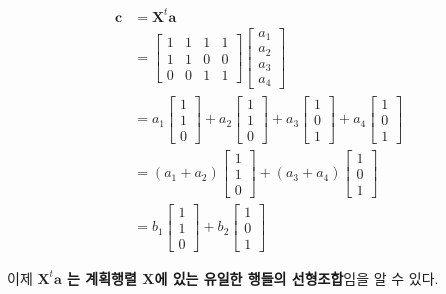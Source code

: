 \documentclass[
]{book}
\newcommand{\bm}[1]{\boldsymbol{\mathbf{#1}}}
\begin{document}
\begin{align}
\bm c &= 
\bm X^t \bm a \\ & = 
\begin{bmatrix}
1 & 1 & 1 & 1  \\
1 & 1 & 0 & 0  \\
0 & 0 & 1 & 1  
\end{bmatrix}
\begin{bmatrix}
a_1 \\
a_2 \\
a_3 \\
a_4 
\end{bmatrix} \\
& = 
a_1 
\begin{bmatrix}
1 \\
1 \\
0 
\end{bmatrix}
+
a_2
\begin{bmatrix}
1 \\
1 \\
0 
\end{bmatrix}
+ 
a_3 
\begin{bmatrix}
1 \\
0 \\
1 
\end{bmatrix}
+
 a_4
\begin{bmatrix}
1 \\
0 \\
1 
\end{bmatrix} \\
& = 
(a_1 + a_2)
\begin{bmatrix}
1 \\
1 \\
0 
\end{bmatrix}
+ 
(a_3 + a_4)
\begin{bmatrix}
1 \\
0 \\
1 
\end{bmatrix} \\
&= 
b_1
\begin{bmatrix}
1 \\
1 \\
0 
\end{bmatrix}
+ 
b_2
\begin{bmatrix}
1 \\
0 \\
1 
\end{bmatrix} 
\label{eq:esticond}
\end{align}

이제 \textbf{\(\bm X^t \bm a\) 는 계획행렬 \(\bm X\)에 있는 유일한 행들의 선형조합}임을 알 수 있다.
\end{document}
